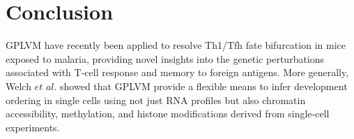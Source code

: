 \documentclass[english, 11pt]{article}\usepackage[]{graphicx}\usepackage[]{color}
\begin{document}
\section{Conclusion}

GPLVM have recently been applied to resolve Th1/Tfh fate bifurcation in mice exposed to malaria, providing novel insights into the genetic perturbations associated with T-cell response and memory to foreign antigens. \cite{lonnberg2017single} More generally, Welch $et$ $al.$ showed that GPLVM provide a flexible means to infer development ordering in single cells using not just RNA profiles but also chromatin accessibility, methylation, and histone modifications derived from single-cell experiments. \cite{welch2017manifold}

\newpage{}



{}
\end{document}

